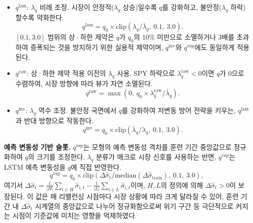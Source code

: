 \documentclass{article}
\begin{document}
\begin{itemize}
  \item $q^{\mathrm{lam}}$: $\lambda_q$ 비례 조정. 시장이 안정적($\lambda_q$ 상승)일수록 $q$를 강화하고, 불안정($\lambda_q$ 하락)할수록 약화한다.
    \begin{equation}
      q^{\mathrm{lam}} = q_0 \times \mathrm{clip}\!\left(\lambda_q/\bar{\lambda}_q,\ 0.1,\ 3.0\right).
    \end{equation}
    $[0.1, 3.0]$ 범위의 상·하한 제약은 $q$가 $q_0$의 10\% 미만으로 소멸하거나 3배를 초과하여 증폭되는 것을 방지하기 위한 실용적 제약이며, $q^{\mathrm{inv}}$와 $q^{\mathrm{vsp}}$에도 동일하게 적용된다.

  \item $q^{\mathrm{raw}}$: 상·하한 제약 적용 이전의 $\lambda_q$ 사용. SPY 하락으로 $\lambda_q^{\mathrm{raw}} < 0$이면 $q$가 0으로 수렴하여, 시장 방향에 따라 뷰가 자연 소멸된다.
    \begin{equation}
      q^{\mathrm{raw}} = \max\!\left(0,\ q_0\times \lambda_q^{\mathrm{raw}}/\bar{\lambda}_q\right).
    \end{equation}

  \item $q^{\mathrm{inv}}$: $\lambda_q$ 역수 조정. 불안정 국면에서 $q$를 강화하여 저변동 방어 전략을 키우는, $q^{\mathrm{lam}}$과 반대 방향으로 작동한다.
    \begin{equation}
      q^{\mathrm{inv}} = q_0 \times \mathrm{clip}\!\left(\bar{\lambda}_q/\lambda_q,\ 0.1,\ 3.0\right).
    \end{equation}
\end{itemize}

\textbf{예측 변동성 기반 슬롯.} $q^{\mathrm{vsp}}$는 모형의 예측 변동성 격차를 훈련 기간 중앙값으로 정규화하여 $q$의 크기를 조정한다. $\lambda_q$ 분류가 매크로 시장 신호를 사용하는 반면, $q^{\mathrm{vsp}}$는 LSTM 예측 변동성을 $q$에 직접 반영한다.
\begin{equation}
  q^{\mathrm{vsp}} = q_0 \times \mathrm{clip}\!\left(\Delta\hat{\sigma}_t/\mathrm{median}(\Delta\hat{\sigma}_{\mathrm{train}}),\ 0.1,\ 3.0\right),
\end{equation}
여기서 $\Delta\hat{\sigma}_t = \frac{1}{|H|}\sum_{i\in H}\hat{\sigma}_{i,t} - \frac{1}{|L|}\sum_{i\in L}\hat{\sigma}_{i,t}$이며, $H, L$의 정의에 의해 $\Delta\hat{\sigma}_t > 0$이 보장된다. 이 값은 매 리밸런싱 시점마다 시장 상황에 따라 크게 달라질 수 있어, 훈련 기간 내 $\Delta\hat{\sigma}_t$ 시계열의 중앙값으로 나누어 정규화함으로써 위기 구간 등 극단적으로 커지는 시점이 기준값에 미치는 영향을 억제하였다.
\end{document}
